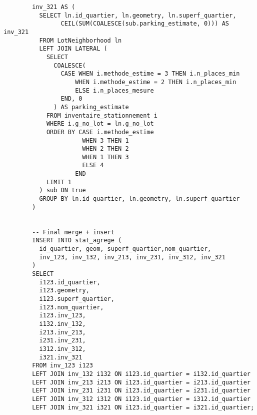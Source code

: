 \begin{lstlisting}
        inv_321 AS (
          SELECT ln.id_quartier, ln.geometry, ln.superf_quartier, 
                CEIL(SUM(COALESCE(sub.parking_estimate, 0))) AS inv_321
          FROM LotNeighborhood ln
          LEFT JOIN LATERAL (
            SELECT 
              COALESCE(
                CASE WHEN i.methode_estime = 3 THEN i.n_places_min
                    WHEN i.methode_estime = 2 THEN i.n_places_min
                    ELSE i.n_places_mesure
                END, 0
              ) AS parking_estimate
            FROM inventaire_stationnement i
            WHERE i.g_no_lot = ln.g_no_lot
            ORDER BY CASE i.methode_estime
                      WHEN 3 THEN 1
                      WHEN 2 THEN 2
                      WHEN 1 THEN 3
                      ELSE 4
                    END
            LIMIT 1
          ) sub ON true
          GROUP BY ln.id_quartier, ln.geometry, ln.superf_quartier
        )


        -- Final merge + insert
        INSERT INTO stat_agrege (
          id_quartier, geom, superf_quartier,nom_quartier,
          inv_123, inv_132, inv_213, inv_231, inv_312, inv_321
        )
        SELECT 
          i123.id_quartier,
          i123.geometry,
          i123.superf_quartier,
          i123.nom_quartier,
          i123.inv_123,
          i132.inv_132,
          i213.inv_213,
          i231.inv_231,
          i312.inv_312,
          i321.inv_321
        FROM inv_123 i123
        LEFT JOIN inv_132 i132 ON i123.id_quartier = i132.id_quartier
        LEFT JOIN inv_213 i213 ON i123.id_quartier = i213.id_quartier
        LEFT JOIN inv_231 i231 ON i123.id_quartier = i231.id_quartier
        LEFT JOIN inv_312 i312 ON i123.id_quartier = i312.id_quartier
        LEFT JOIN inv_321 i321 ON i123.id_quartier = i321.id_quartier;
\end{lstlisting}

